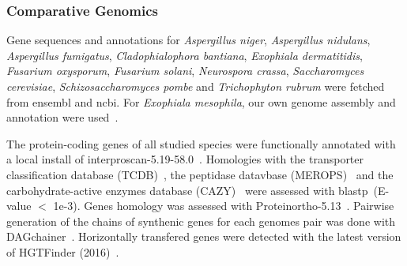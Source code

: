 \documentclass[fontsize=10pt, paper=a4,fleqn, ]{wlscirep}
\newif\ifcode
\newcommand{\TODO}[1]{\textbf{\color{red}{#1}}}
\newcommand{\exoDer}{\textit{Exophiala dermatitidis}}
\newcommand{\exoMes}{\textit{Exophiala mesophila}}
\newcommand{\aspNig}{\textit{Aspergillus niger}}
\newcommand{\aspNid}{\textit{Aspergillus nidulans}}
\newcommand{\aspFum}{\textit{Aspergillus fumigatus}}
\newcommand{\triRub}{\textit{Trichophyton rubrum}}
\newcommand{\neuCra}{\textit{Neurospora crassa}}
\newcommand{\sacCer}{\textit{Saccharomyces cerevisiae}}
\newcommand{\schPom}{\textit{Schizosaccharomyces pombe}}
\newcommand{\fusOxy}{\textit{Fusarium oxysporum}}
\newcommand{\fusSol}{\textit{Fusarium solani}}
\newcommand{\claBan}{\textit{Cladophialophora bantiana}}
\begin{document}
\TODO{Protein Coding}


\subsubsection{Comparative Genomics}
Gene sequences and annotations for \aspNig, \aspNid, \aspFum, \claBan,
\exoDer, \fusOxy, \fusSol, \neuCra, \sacCer, {\schPom} and {\triRub} were
fetched from ensembl and ncbi. For {\exoMes}, our own genome assembly
and annotation were used~\cite{Tafer2015a}.
\ifcode
\begin{listing}[h]
  \perlCode{/media/work/genomes/claImm/comparativeGenomicsAnalysis/biomartWebService.pl}
  \label{code:fAperl}
  \caption{Perl used to fetch the protein functional annotation of 6/10 genomes.}
\end{listing}
\begin{listing}[h]
  \xmlCode{/media/work/genomes/claImm/comparativeGenomicsAnalysis/fetch.xml}
  \label{code:fAxml}
  \caption{xml used to fetch the protein functional annotation of 6/10 genomes.}
\end{listing}
\begin{listing}[h]
  \mint[breaklines,bgcolor=black,formatcom=\color{white},fontsize=\footnotesize]{shell}{parallel -j 8 "perl ./biomartWebService.pl -s {} -x fetch.xml > {}.csv" ::: anidulans aniger afumigatus ncrassa scerevisiae spombe}
  \label{code:fAbash}
  \caption{shell command used to fetch the protein functional annotation of 6/9 genomes.}
\end{listing}
\fi

The protein-coding genes of all studied species were functionally
annotated with a local install of
interproscan-5.19-58.0~\cite{Jones2014}. Homologies with   the
transporter classification database (TCDB)~\cite{Saier2016}, the
peptidase datavbase (MEROPS)~\cite{Rawlings2014} and the
carbohydrate-active enzymes database (CAZY)~\cite{Cantarel2009} were
assessed with blastp~\cite{Altschul:97b}(E-value $<$ 1e-3). Genes
homology was assessed with
Proteinortho-5.13~\cite{Lechner2011}. Pairwise generation of the
chains of synthenic genes for each genomes pair was done with
DAGchainer~\cite{Haas2004}. Horizontally transfered genes were
detected with the latest version of HGTFinder
(2016)~\cite{Nguyen2015}.
\end{document}
